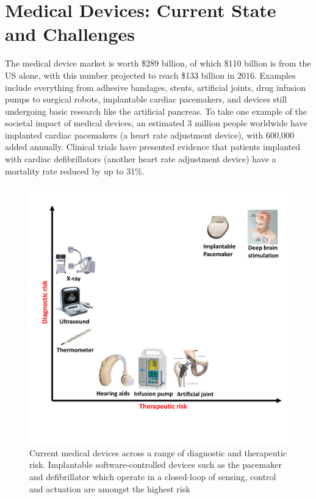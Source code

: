 \chapter{Medical Devices: Current State and Challenges}

The medical device market is worth \$289 billion, of which \$110 billion is from the US alone, with this number projected to reach \$133 billion in 2016.
Examples include everything from adhesive bandages, stents, artificial joints, drug infusion pumps to surgical robots, implantable cardiac pacemakers, and devices still undergoing basic research like the artificial pancreas.
To take one example of the societal impact of medical devices, an estimated 3 million people worldwide have implanted cardiac pacemakers (a heart rate adjustment device), with 600,000 added annually.
Clinical trials have presented evidence that patients implanted with cardiac defibrillators (another heart rate adjustment device) have a mortality rate reduced by up to 31\%.

\begin{figure}[t]
		\centering
		\includegraphics[width=\textwidth]{figs/devices_new.pdf}
		\caption{\small Current medical devices across a range of diagnostic and therapeutic risk. Implantable software-controlled devices such as the pacemaker and defibrillator which operate in a closed-loop of sensing, control and actuation are amongst the highest risk}
		\label{fig:Cur}
\end{figure}

